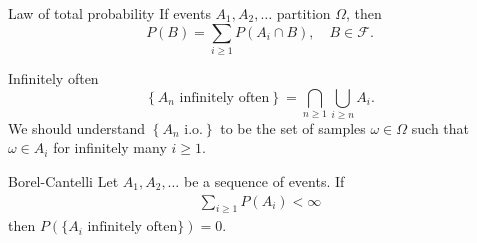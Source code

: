     \begin{thrm}{Law of total probability}{}
        If events \( A_1, A_2,\dots  \) partition \( \Omega  \), then 
        \[
            P(B) = \sum_{i\geq 1} P(A_{i} \cap B), \quad B \in \mathcal{F} .
        \]
        \end{thrm}

        \begin{defn}{Infinitely often}{}
            \[
                \left\{ A_{n} \text{ infinitely often}  \right\} = \bigcap_{n\geq 1} \bigcup_{i\geq n} A_{i}. 
            \]
            We should understand \( \left\{ A_{n} \text{ i.o.}  \right\}  \) to be the set of samples \( \omega \in \Omega  \) such that \( \omega \in A_{i}  \) for infinitely many \( i\geq 1 \). 
            \end{defn}

            \begin{lem}{Borel-Cantelli}{}
                Let \( A_1, A_2,\dots  \) be a sequence of events. If 
                \begin{align*}
                    \sum_{i\geq 1} P(A_{i} ) < \infty 
                \end{align*}
                then \( P(\{A_{i} \text{ infinitely often} \}) = 0.\) 
                \end{lem}

